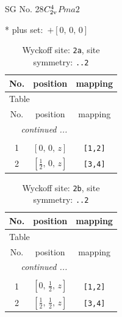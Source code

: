 \documentclass[fleqn,8pt]{jsarticle}
\begin{document}
\setcounter{MaxMatrixCols}{32}

\renewcommand{\tablename}{Table~}
\renewcommand{\figurename}{Figure~}
\begin{center}
\LARGE
SG No. 28\quad$C_{\rm 2v}^{4}$\quad$Pma2$\quad[ orthorhombic ]
\end{center}
* plus set:\,\,\,$+\left[ 0,\, 0,\, 0 \right]$
\renewcommand{\arraystretch}{1.2}
\begin{longtable}{ccc}
\caption{Wyckoff site: {\tt 2a}, site symmetry: {\tt ..2}}
 \\
 \hline \hline
No. & position & mapping \\ \hline \endfirsthead

\multicolumn{2}{l}{\tablename\ \thetable{}} \\
 \hline \hline
No. & position & mapping \\ \hline \endhead

 \hline \hline
\multicolumn{2}{r}{\footnotesize\it continued ...} \\ \endfoot

 \hline \hline
\multicolumn{2}{r}{} \\ \endlastfoot

1 & $\left[ 0,\, 0,\, z \right]$ & {\tt [1,2]} \\ \hline
2 & $\left[ \frac{1}{2},\, 0,\, z \right]$ & {\tt [3,4]} \\
\end{longtable}
\renewcommand{\arraystretch}{1.2}
\begin{longtable}{ccc}
\caption{Wyckoff site: {\tt 2b}, site symmetry: {\tt ..2}}
 \\
 \hline \hline
No. & position & mapping \\ \hline \endfirsthead

\multicolumn{2}{l}{\tablename\ \thetable{}} \\
 \hline \hline
No. & position & mapping \\ \hline \endhead

 \hline \hline
\multicolumn{2}{r}{\footnotesize\it continued ...} \\ \endfoot

 \hline \hline
\multicolumn{2}{r}{} \\ \endlastfoot

1 & $\left[ 0,\, \frac{1}{2},\, z \right]$ & {\tt [1,2]} \\ \hline
2 & $\left[ \frac{1}{2},\, \frac{1}{2},\, z \right]$ & {\tt [3,4]} \\
\end{longtable}
\end{document}
